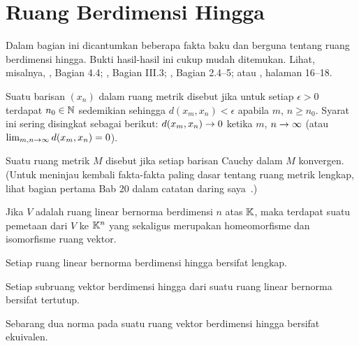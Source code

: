 \section{Ruang Berdimensi Hingga}
Dalam bagian ini dicantumkan beberapa fakta baku dan berguna tentang ruang berdimensi hingga. Bukti hasil-hasil ini
cukup mudah ditemukan. Lihat, misalnya, \cite{BrownP:1970}, Bagian 4.4; \cite{Conway:1990}, Bagian III.3;
\cite{Kreyszig:1978}, Bagian 2.4--5; atau \cite{Rudin:1991}, halaman 16--18.

\begin{defn} Suatu barisan $(x_n)$ dalam ruang metrik disebut
 jika untuk setiap $\epsilon > 0$ terdapat $n_0 \in \mathbb{N}$ sedemikian sehingga
$d(x_m,x_n) < \epsilon$ apabila $m$, $n \ge n_0$. Syarat ini sering disingkat sebagai
berikut: $d(x_m, x_n) \rightarrow 0$ ketika $m$, $n \rightarrow \infty$ (atau $\lim_{m,n \rightarrow
\infty}d(x_m,x_n) = 0$).
\end{defn}

\begin{defn} Suatu ruang metrik $M$ disebut
 jika setiap barisan Cauchy dalam $M$ konvergen. (Untuk meninjau kembali fakta-fakta paling dasar tentang ruang
metrik lengkap, lihat bagian pertama Bab 20 dalam catatan daring saya~\cite{Erdman:2007}.)
\end{defn}

\begin{prop}\label{prop_fdnls_Kn} Jika $V$ adalah ruang linear bernorma berdimensi $n$ atas $\mathbb{K}$, maka terdapat suatu pemetaan
dari $V$ ke $\mathbb{K}^n$ yang sekaligus merupakan homeomorfisme dan isomorfisme ruang vektor.
\end{prop}

\begin{cor} Setiap ruang linear bernorma berdimensi hingga bersifat lengkap.
\end{cor}

\begin{cor}\label{cor_fdvs_closed} Setiap subruang vektor berdimensi hingga dari suatu ruang linear bernorma bersifat tertutup.
\end{cor}

\begin{cor}\label{cor_fdvs_norms_equiv} Sebarang dua norma pada suatu ruang vektor berdimensi hingga bersifat ekuivalen.
\end{cor}

